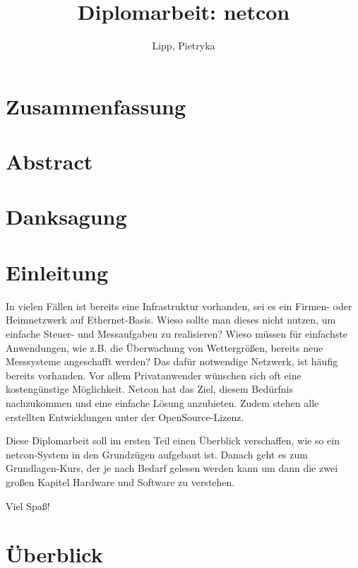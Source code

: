 \documentclass[a4paper,14pt,headsepline]{scrartcl}
\begin{document}
\author{Lipp, Pietryka} 
\title{Diplomarbeit: netcon} 
\date{} 
\maketitle

\newpage

\section*{Zusammenfassung}
\newpage

\section*{Abstract}
\newpage

\section*{Danksagung}
\newpage

\section*{Einleitung}
In vielen Fällen ist bereits eine Infrastruktur vorhanden, sei es ein Firmen- oder Heimnetzwerk auf Ethernet-Basis. Wieso sollte man dieses nicht nutzen, um einfache Steuer- und Messaufgaben zu realisieren? Wieso müssen für einfachste Anwendungen, wie z.B. die Überwachung von Wettergrößen, bereits neue Messsysteme angeschafft werden? Das dafür notwendige Netzwerk, ist häufig bereits vorhanden. Vor allem Privatanwender wünschen sich oft eine kostengünstige Möglichkeit. Netcon hat das Ziel, diesem Bedürfnis nachzukommen und eine einfache Lösung anzubieten. Zudem stehen alle erstellten Entwicklungen unter der OpenSource-Lizenz. 

Diese Diplomarbeit soll im ersten Teil einen Überblick verschaffen, wie so ein netcon-System in den Grundzügen aufgebaut ist. Danach geht es zum Grundlagen-Kurs, der je nach Bedarf gelesen werden kann um dann die zwei großen Kapitel Hardware und Software zu verstehen.

Viel Spaß!

\newpage

\tableofcontents
\newpage


\section{Überblick}
\end{document}
